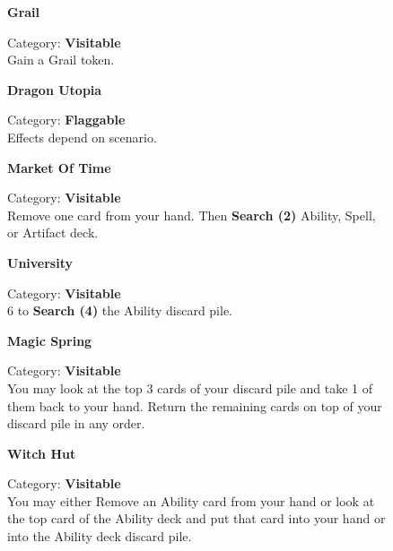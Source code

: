 \begin{figure}[h]
  \begin{minipage}[t]{0.48\textwidth}
    \centering
    \textbf{Grail}\\
    \caption{Category: \textbf{Visitable}\\
      Gain a Grail token.}
  \end{minipage}\hfill
  \begin{minipage}[t]{0.48\textwidth}
    \centering
    \textbf{Dragon Utopia}\\
    \caption{Category: \textbf{Flaggable}\\Effects depend on scenario.}
  \end{minipage}
\end{figure}

\begin{figure}[h]
  \begin{minipage}[t]{0.48\textwidth}
    \centering
    \textbf{Market Of Time}\\
    \caption{Category: \textbf{Visitable}\\ Remove one card from your hand.
Then \textbf{Search (2)} Ability, Spell, or Artifact deck.}
  \end{minipage}\hfill
  \begin{minipage}[t]{0.48\textwidth}
    \centering
    \textbf{University}\\
    \caption{Category: \textbf{Visitable}\\
       6  to \textbf{Search (4)} the Ability discard pile.}
  \end{minipage}
\end{figure}

\begin{figure}[h]
  \begin{minipage}[t]{0.48\textwidth}
    \centering
    \textbf{Magic Spring}\\
    \caption{Category: \textbf{Visitable}\\
      You may look at the top 3 cards of your discard pile and take 1 of them back to your hand.
      Return the remaining cards on top of your discard pile in any order.}
  \end{minipage}\hfill
  \begin{minipage}[t]{0.48\textwidth}
    \centering
    \textbf{Witch Hut}\\
    \caption{Category: \textbf{Visitable}\\
      You may either Remove an Ability card from your hand or look at the top card of the Ability deck and put that card into your hand or into the Ability deck discard pile.}
  \end{minipage}
\end{figure}

